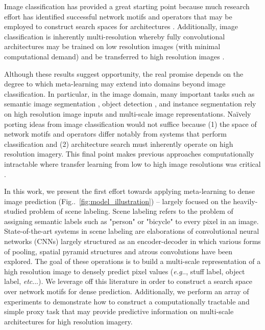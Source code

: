 \documentclass{article}
\makeatletter
\def\@onedot{\ifx\@let@token.\else.\null\fi\xspace}
\DeclareRobustCommand\onedot{\futurelet\@let@token\@onedot}
\newcommand{\figref}[1]{Fig\onedot~\ref{#1}}
\def\eg{\emph{e.g}\onedot} \def\Eg{\emph{E.g}\onedot}
\def\etc{\emph{etc}\onedot} \def\vs{\emph{vs}\onedot}
\makeatother
\begin{document}
Image classification has provided a great starting point because much research effort has identified successful network motifs and operators that may be employed to construct search spaces for architectures \cite{liu2018progressive,real2018regularized,zoph2017learning}. Additionally, image classification is inherently multi-resolution whereby fully convolutional architectures \cite{sermanet2013overfeat,long2014fully} may be trained on low resolution images (with minimal computational demand) and be transferred to high resolution images \cite{zoph2017learning}.

Although these results suggest opportunity, the real promise depends on the degree to which meta-learning may extend into domains beyond image classification.
In particular, in the image domain, many important tasks such as semantic image segmentation \cite{long2014fully,chen2017deeplab,zhao2017pyramid}, object detection \cite{ren2015faster,dai2016rfcn}, and instance segmentation \cite{dai2016instance,he2017mask,chen2018masklab} rely on high resolution image inputs and multi-scale image representations.
Na\"{i}vely porting ideas from image classification would not suffice because (1) the space of network motifs and operators differ notably from systems that perform classification and (2) architecture search must inherently operate on high resolution imagery. This final point makes previous approaches computationally intractable where transfer learning from low to high image resolutions was critical \cite{zoph2017learning}.

In this work, we present the first effort towards applying meta-learning to dense image prediction (\figref{fig:model_illustration}) -- largely focused on the heavily-studied problem of scene labeling.  
Scene labeling refers to the problem of assigning semantic labels such as "person" or "bicycle" to every pixel in an image.
State-of-the-art systems in scene labeling are elaborations of convolutional neural networks (CNNs) largely structured as an encoder-decoder in which various forms of pooling, spatial pyramid structures \cite{zhao2017pyramid} and atrous convolutions \cite{chen2017deeplab} have been explored.
The goal of these operations is to build a multi-scale representation of a high resolution image to densely predict pixel values (\eg, stuff label, object label, \etc.).
We leverage off this literature in order to construct a search space over network motifs for dense prediction.
Additionally, we perform an array of experiments to demonstrate how to construct a computationally tractable and simple proxy task that may provide predictive information on multi-scale architectures for high resolution imagery.
\end{document}
